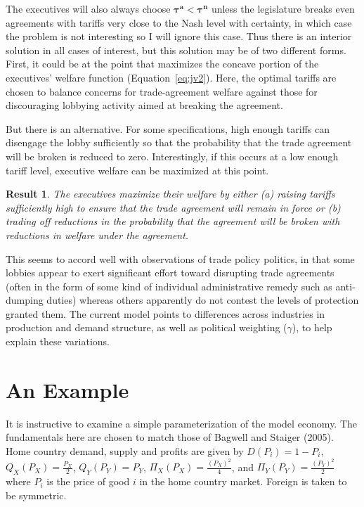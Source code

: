 \documentclass[10pt]{article}
\newtheorem{result}{Result}
\newcommand{\bta}{\bm{\tau^a}}
\newcommand{\btn}{\bm{\tau^n}}
\newcommand{\ga}{\gamma}
\begin{document}
The executives will also always choose $\bta < \btn$ unless the legislature breaks even agreements with tariffs very close to the Nash level with certainty, in which case the problem is not interesting so I will ignore this case. Thus there is an interior solution in all cases of interest, but this solution may be of two different forms. First, it could be at the point that maximizes the concave portion of the executives' welfare function (Equation~\ref{eq:jv2}). Here, the optimal tariffs are chosen to balance concerns for trade-agreement welfare against those for discouraging lobbying activity aimed at breaking the agreement.

But there is an alternative. For some specifications, high enough tariffs can disengage the lobby sufficiently so that the probability that the trade agreement will be broken is reduced to zero. Interestingly, if this occurs at a low enough tariff level, executive welfare can be maximized at this point. 
\begin{result}
  The executives maximize their welfare by either (a) raising tariffs sufficiently high to ensure that the trade agreement will remain in force or (b) trading off reductions in the probability that the agreement will be broken with reductions in welfare under the agreement.
  \label{res:execsoln}
\end{result}
This seems to accord well with observations of trade policy politics, in that some lobbies appear to exert significant effort toward disrupting trade agreements (often in the form of some kind of individual administrative remedy such as anti-dumping duties) whereas others apparently do not contest the levels of protection granted them. The current model points to differences across industries in production and demand structure, as well as political weighting ($\ga$), to help explain these variations.


\section{An Example}
\label{sec:example}
It is instructive to examine a simple parameterization of the model economy. The fundamentals here are chosen to match those of Bagwell and Staiger (2005). Home country demand, supply and profits are given by $D(P_i) = 1 - P_i$, $Q_X(P_X) = \frac{P_X}{2}$, $Q_Y(P_Y) = P_Y$, $\Pi_X(P_X) = \frac{(P_X)^2}{4}$, and $\Pi_Y(P_Y) = \frac{(P_Y)^2}{2}$ where $P_i$ is the price of good $i$ in the home country market. %
Foreign is taken to be symmetric.
\end{document}
